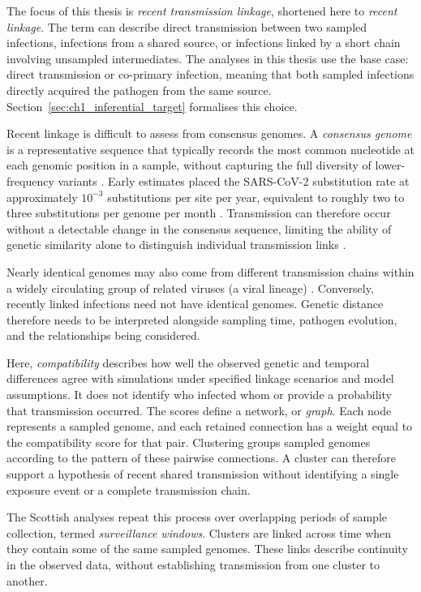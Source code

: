 The focus of this thesis is \emph{recent transmission linkage}, shortened here to \emph{recent linkage}. The term can describe direct transmission between two sampled infections, infections from a shared source, or infections linked by a short chain involving unsampled intermediates. The analyses in this thesis use the base case: direct transmission or co-primary infection, meaning that both sampled infections directly acquired the pathogen from the same source. Section~\ref{sec:ch1_inferential_target} formalises this choice.

Recent linkage is difficult to assess from consensus genomes. A \emph{consensus genome} is a representative sequence that typically records the most common nucleotide at each genomic position in a sample, without capturing the full diversity of lower-frequency variants \citep{Valesano2021}. Early estimates placed the SARS-CoV-2 substitution rate at approximately $10^{-3}$ substitutions per site per year, equivalent to roughly two to three substitutions per genome per month \citep{Duchene2020}. Transmission can therefore occur without a detectable change in the consensus sequence, limiting the ability of genetic similarity alone to distinguish individual transmission links \citep{Braun2021}.

Nearly identical genomes may also come from different transmission chains within a widely circulating group of related viruses (a viral lineage) \citep{Louca2021,GallegoGarcia2022,Fiam2024}. Conversely, recently linked infections need not have identical genomes. Genetic distance therefore needs to be interpreted alongside sampling time, pathogen evolution, and the relationships being considered.

Here, \emph{compatibility} describes how well the observed genetic and temporal differences agree with simulations under specified linkage scenarios and model assumptions. It does not identify who infected whom or provide a probability that transmission occurred. The scores define a network, or \emph{graph}. Each node represents a sampled genome, and each retained connection has a weight equal to the compatibility score for that pair. Clustering groups sampled genomes according to the pattern of these pairwise connections. A cluster can therefore support a hypothesis of recent shared transmission without identifying a single exposure event or a complete transmission chain.

The Scottish analyses repeat this process over overlapping periods of sample collection, termed \emph{surveillance windows}. Clusters are linked across time when they contain some of the same sampled genomes. These links describe continuity in the observed data, without establishing transmission from one cluster to another.

